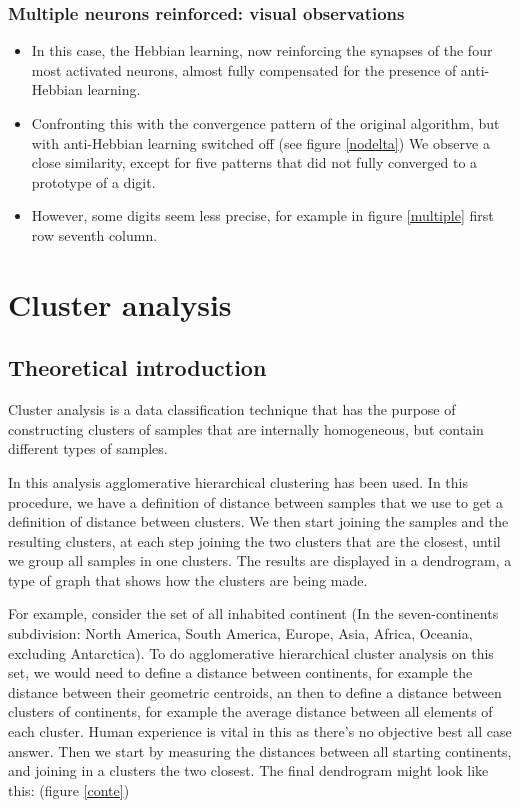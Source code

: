 \documentclass[a4paper]{report}
\begin{document}
\subsection{Multiple neurons reinforced: visual observations}

\begin{itemize}
    \item In this case, the Hebbian learning, now reinforcing the synapses of the four most activated neurons, almost fully compensated for the presence of anti-Hebbian learning.
    \item Confronting this with the convergence pattern of the original algorithm, but with anti-Hebbian learning switched off  (see figure \ref{nodelta}) We observe a close similarity, except for five patterns that did not fully converged to a prototype of a digit.
    \item However, some digits seem less precise, for example in figure \ref{multiple} first row seventh column.
\end{itemize}

\chapter{Cluster analysis}

\section{Theoretical introduction}

Cluster analysis is a data classification technique that has the purpose of constructing clusters of samples that are internally homogeneous, but contain different types of samples.

In this analysis agglomerative hierarchical clustering has been used.
In this procedure, we have a definition of distance between samples that we use to get a definition of distance between clusters.
We then start joining the samples and the resulting clusters, at each step joining the two clusters that are the closest, until we group all samples in one clusters.
The results are displayed in a dendrogram, a type of graph that shows how the clusters are being made.

For example, consider the set of all inhabited continent (In the seven-continents subdivision:
North America, South America, Europe, Asia, Africa, Oceania, excluding Antarctica).
To do agglomerative hierarchical cluster analysis on this set, we would need to define a distance between continents, for example the distance between their geometric centroids, an then to define a distance between clusters of continents, for example the average distance between all elements of each cluster.
Human experience is vital in this as there's no objective best all case answer.
Then we start by measuring the distances between all starting continents, and joining in a clusters the two closest.
The final dendrogram might look like this:
(figure \ref{conte})
\end{document}
